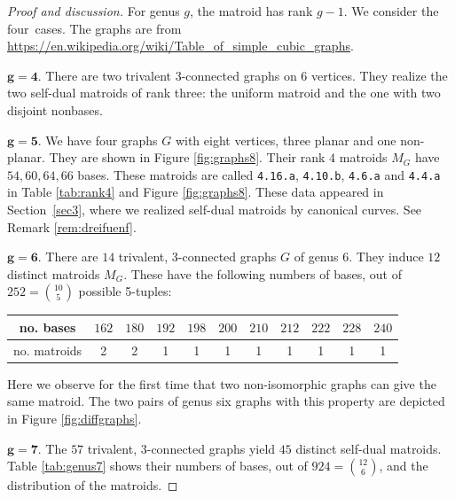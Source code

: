 \documentclass[12pt]{extarticle}
\theoremstyle{definition}
\numberwithin{theorem}{section}
\theoremstyle{plain}\newtheorem{ithm}{Theorem}
\begin{document}
\begin{proof}[Proof and discussion]
For genus $g$, the matroid has rank $g-1$.
We consider the four~cases.
The graphs are  from
\url{https://en.wikipedia.org/wiki/Table_of_simple_cubic_graphs}.

$\mathbf{g=4}.$ There are two trivalent 3-connected graphs on 6 vertices. They realize the two self-dual matroids of rank three:
the uniform matroid and the one with two disjoint nonbases.


\smallskip
$\mathbf{g=5.}$ \label{ex:graphs4}
We have four graphs $G$ with eight vertices, three planar and one non-planar. 
They are shown in  Figure \ref{fig:graphs8}.
Their rank $4$ matroids $M_G$ have
$54, 60, 64, 66 $ bases.  These matroids are called 
\texttt{4.16.a}, \texttt{4.10.b},  \texttt{4.6.a} and \texttt{4.4.a}
in  Table \ref{tab:rank4} and Figure \ref{fig:graphs8}.
These data appeared in Section~\ref{sec3}, where we
realized self-dual matroids  by
canonical curves. See Remark \ref{rem:dreifuenf}.



\smallskip
$\mathbf{g=6.}$\label{ex:graphsgenus6}
There are $14$ trivalent, 3-connected graphs $G$ of genus $6$. They induce $12$ distinct matroids $M_G$.
These  have the following numbers of bases,  out of $252 = \binom{10}{5}$
possible 5-tuples:
\begin{center}
  \begin{tabular}{c|cccccccccc}
    no. bases & $ 162 $& $180$&$ 192$&$ 198$&$ 200$ & $210$ & $212$ &$222$ & $228$& $240$\\ \hline 
    no. matroids & 2 & 2 & 1 & 1 & 1 & 1 & 1 & 1 & 1 & 1
  \end{tabular}
\end{center}
Here we observe for the first time that two non-isomorphic graphs can 
give the same matroid.
The two pairs of genus six graphs 
with this property are depicted in Figure \ref{fig:diffgraphs}. 


\smallskip
$\mathbf{g=7.}$ 
The $57$ trivalent, 3-connected graphs yield
 $45$ distinct self-dual matroids.
Table \ref{tab:genus7} shows their numbers of bases, out of $924 = \binom{12}{6}$, and the distribution 
of the matroids.  
\end{proof}
\end{document}

